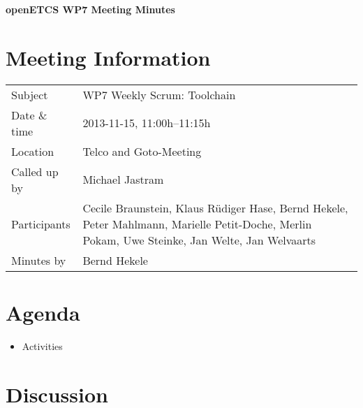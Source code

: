 \documentclass[a4paper, 11pt]{article}
\begin{document}
{\begin{center}\huge\bf openETCS WP7 Meeting Minutes\end{center}}
\section{Meeting Information}

\renewcommand{\arraystretch}{1.5}
\begin{supertabular}{m{.2\textwidth}m{.8\textwidth}}
Subject & WP7 Weekly Scrum: Toolchain\\
Date \& time & 2013-11-15, 11:00h--11:15h\\
Location & Telco and Goto-Meeting\\
Called up by & Michael Jastram\\
Participants &
Cecile Braunstein,
Klaus R\"udiger Hase,
Bernd Hekele,
Peter Mahlmann,
Marielle Petit-Doche,
Merlin Pokam,
Uwe Steinke,
Jan Welte,
Jan Welvaarts
\\

Minutes by & Bernd Hekele\\

\end{supertabular}
\renewcommand{\arraystretch}{1.0}


\section{Agenda}
\begin{itemize}
\item Activities
\end{itemize}

\section{Discussion}
\end{document}
